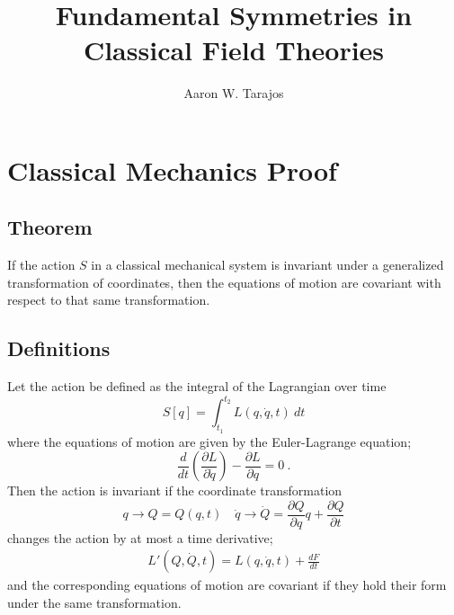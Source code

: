 \documentclass{article}
\title{Fundamental Symmetries in Classical Field Theories}
\author{Aaron W. Tarajos}
\begin{document}
\maketitle

\section{Classical Mechanics Proof}

\subsection{Theorem}
If the action $S$ in a classical mechanical system is invariant under a generalized transformation of coordinates, then the equations of motion are covariant with respect to that same transformation.

\subsection{Definitions}
Let the action be defined as the integral of the Lagrangian over time
\begin{equation}
	S[q] = \int_{t_1}^{t_2} L\left(q, \dot q, t\right) \ dt
\end{equation}
where the equations of motion are given by the Euler-Lagrange equation;
\begin{equation}
    \frac{d}{dt}\left( \frac{\partial L}{\partial \dot q}\right) - \frac{\partial L}{\partial q} = 0\ .
\end{equation}
Then the action is invariant if the coordinate transformation
\begin{equation}
	q \to Q = Q\left(q,t\right) \quad \dot q \to \dot Q = \frac{\partial Q}{\partial q}q + \frac{\partial Q}{\partial t}
\end{equation}
changes the action by at most a time derivative;
\begin{align}
	L'(Q, \dot{Q}, t) = L(q, \dot{q}, t) + \frac{dF}{dt}
\end{align}
and the corresponding equations of motion are covariant if they hold their form under the same transformation.
\end{document}
